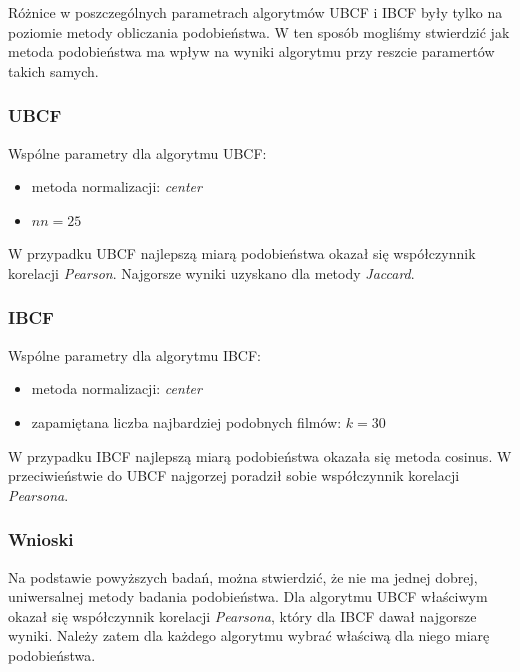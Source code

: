 \documentclass[12pt, a4paper]{article}
\begin{document}
Różnice w poszczególnych parametrach algorytmów UBCF i IBCF były tylko na poziomie metody obliczania podobieństwa. W ten sposób mogliśmy stwierdzić jak metoda podobieństwa ma wpływ na wyniki algorytmu przy reszcie paramertów takich samych. 

\subsubsection{UBCF}
Wspólne parametry dla algorytmu UBCF:
\begin{itemize}
\item metoda normalizacji: \emph{center}
\item $nn = 25$
\end{itemize}

W przypadku UBCF najlepszą miarą podobieństwa okazał się współczynnik korelacji \emph{Pearson}. Najgorsze wyniki uzyskano dla metody \emph{Jaccard}.



\subsubsection{IBCF}
Wspólne parametry dla algorytmu IBCF:
\begin{itemize}
\item metoda normalizacji: \emph{center}
\item zapamiętana liczba najbardziej podobnych filmów: $k = 30$
\end{itemize}

W przypadku IBCF najlepszą miarą podobieństwa okazała się metoda cosinus. W przeciwieństwie do UBCF najgorzej poradził sobie współczynnik korelacji \emph{Pearsona}.



\subsubsection{Wnioski}
Na podstawie powyższych badań, można stwierdzić, że nie ma jednej dobrej, uniwersalnej metody badania podobieństwa. Dla algorytmu UBCF właściwym okazał się współczynnik korelacji \emph{Pearsona}, który dla IBCF dawał najgorsze wyniki. Należy zatem dla każdego algorytmu wybrać właściwą dla niego miarę podobieństwa.
\end{document}

